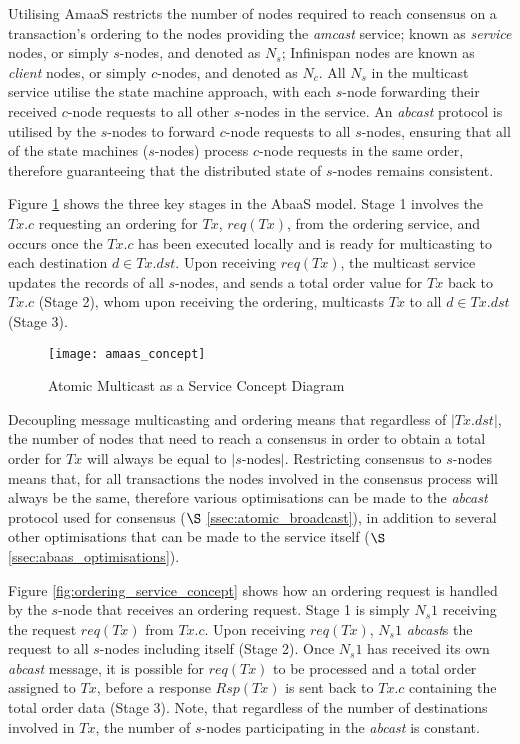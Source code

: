 Utilising \textsf{AmaaS} restricts the number of nodes required to reach consensus on a transaction's ordering to the nodes providing the \emph{amcast} service; known as \emph{service} nodes, or simply $s$-nodes, and denoted as $N_s$; Infinispan nodes are known as \emph{client} nodes, or simply $c$-nodes, and denoted as $N_c$.  All $N_s$ in the multicast service utilise the state machine approach, with each $s$-node forwarding their received $c$-node requests to all other $s$-nodes in the service.  An \emph{abcast} protocol is utilised by the $s$-nodes to forward $c$-node requests to all $s$-nodes, ensuring that all of the state machines ($s$-nodes) process $c$-node requests in the same order, therefore guaranteeing that the distributed state of $s$-nodes remains consistent.  

Figure \ref{fig:abaas_concept} shows the three key stages in the \textsf{AbaaS} model.  Stage 1 involves the $Tx.c$ requesting an ordering for $Tx$, $req(Tx)$,  from the ordering service, and occurs once the $Tx.c$ has been executed locally and is ready for multicasting to each destination $d \in Tx.dst$.  Upon receiving $req(Tx)$, the multicast service updates the records of all $s$-nodes, and sends a total order  value for $Tx$ back to $Tx.c$ (Stage 2), whom upon receiving the ordering, multicasts $Tx$ to all $d \in Tx.dst$ (Stage 3).  


    \begin{figure}[htbp!] 
        \centering    
         \texttt{[image: amaas\_concept]}
         \caption[Atomic Multicast as a Service Concept Diagram]{Atomic Multicast as a Service Concept Diagram}
         \label{fig:abaas_concept}
    \end{figure}	 

Decoupling message multicasting and ordering means that regardless of $\left\vert Tx.dst \right\vert$, the number of nodes that need to reach a consensus in order to obtain a total order for $Tx$ will always be equal to $\left\vert s\text{-nodes}\right\vert$.  Restricting consensus to $s$-nodes means that, for all transactions the nodes involved in the consensus process will always be the same, therefore various optimisations can be made to the \emph{abcast} protocol used for consensus ($\S$ \ref{ssec:atomic_broadcast}), in addition to several other optimisations that can be made to the service itself ($\S$ \ref{ssec:abaas_optimisations}).  

Figure \ref{fig:ordering_service_concept} shows how an ordering request is handled by the $s$-node that receives an ordering request.  Stage 1 is simply $N_s1$ receiving the request $req(Tx)$ from $Tx.c$.  Upon receiving $req(Tx)$, $N_s1$ \emph{abcast}s the request to all $s$-nodes including itself (Stage 2).  Once $N_s1$ has received its own \emph{abcast} message, it is possible for $req(Tx)$ to be processed and a total order assigned to $Tx$, before a response $Rsp(Tx)$ is sent back to $Tx.c$ containing the total order data (Stage 3).  Note, that regardless of the number of destinations involved in $Tx$, the number of $s$-nodes participating in the \emph{abcast} is constant.  


